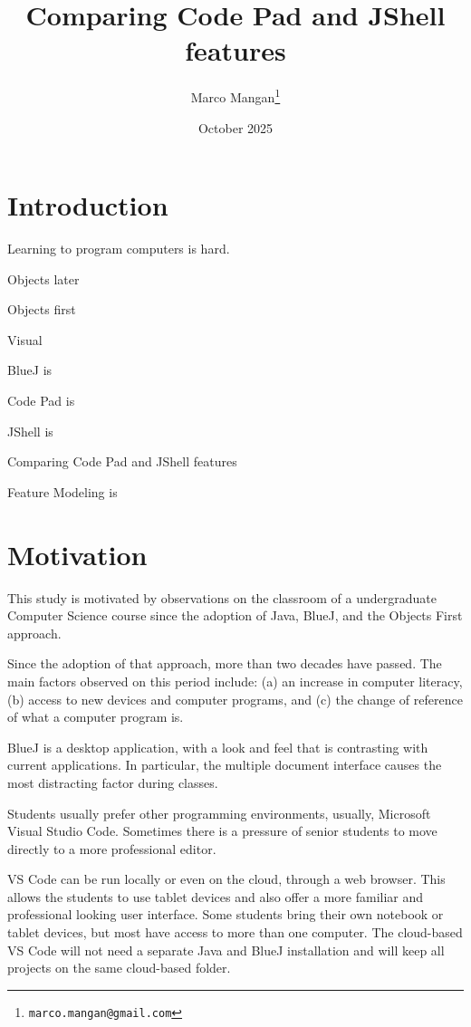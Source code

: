 \documentclass{article}
\title{Comparing Code Pad and JShell features}
\author{Marco Mangan\thanks{\texttt{marco.mangan@gmail.com}}}
\date{October 2025}
\begin{document}
\maketitle

\section{Introduction}

Learning to program computers is hard. 

Objects later

Objects first

Visual

BlueJ is \cite{barnes2008objects}\cite{bluej_paper}

Code Pad is

JShell is \cite{jshell_docs}

Comparing Code Pad and JShell features

Feature Modeling is

\section{Motivation}

This study is motivated by observations on the classroom of a undergraduate Computer Science course since the adoption of Java, BlueJ, and the Objects First approach.

Since the adoption of that approach, more than two decades have passed. The main factors observed on this period include: (a) an increase in computer literacy, (b) access to new devices and computer programs, and (c) the change of reference of what a computer program is.

BlueJ is a desktop application, with a look and feel that is contrasting with current applications. In particular, the multiple document interface causes the most distracting factor during classes.

Students usually prefer other programming environments, usually, Microsoft Visual Studio Code. Sometimes there is a pressure of senior students to move directly to a more professional editor. 


VS Code can be run locally or even on the cloud, through a web browser. This allows the students to use tablet devices and also offer a more familiar and professional looking user interface. Some students bring their own notebook or tablet devices, but most have access to more than one computer. The cloud-based VS Code will not need a separate Java and BlueJ installation and will keep all projects on the same cloud-based folder.
\end{document}
